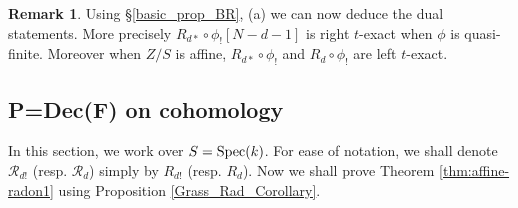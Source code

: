 \documentclass[12pt, reqno]{amsart}
\theoremstyle{plain}
\theoremstyle{definition}
\newtheorem{rem}[thm]{\bf Remark}
\theoremstyle{definition}
\newcommand{\cR}{{\mathcal R}}
\newcommand{\Spec}{{\rm Spec}}
\begin{document}
\begin{rem}\label{duality_remark_GRass}
    Using \S \ref{basic_prop_BR}, (a) we can now deduce the dual statements. More precisely $R_{d*}\circ \phi_{!}[N-d-1]$ is right $t$-exact when $\phi$ is quasi-finite. Moreover when $Z/S$ is affine, $R_{d*} \circ \phi_{!}$ and $R_d\circ \phi_{!}$ are left $t$-exact.
\end{rem}

\subsection{P=Dec(F) on cohomology}\label{P_Dec(F)_Coho}

In this section, we work over $S=\Spec(k)$. For ease of notation, we shall denote $\cR_{d!}$ (resp. $\cR_{d}$) simply by $R_{d!}$ (resp. $R_{d}$). Now we shall prove Theorem \ref{thm:affine-radon1} using Proposition \ref{Grass_Rad_Corollary}.
\end{document}
